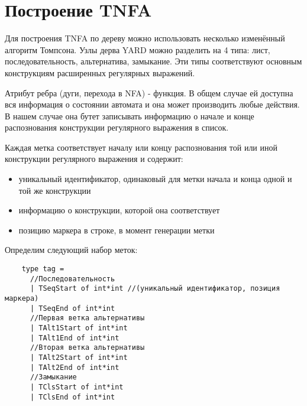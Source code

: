 \documentclass{article}
\begin{document}
\section{Построение TNFA}  

Для построения TNFA по дереву можно использовать несколько изменённый алгоритм Томпсона. Узлы дерва YARD можно разделить на 4 типа: лист, последовательность, альтернатива, замыкание. Эти типы соответствуют основным конструкциям расширенных регулярных выражений.

Атрибут ребра (дуги, перехода в NFA) - функция. В общем случае ей доступна вся информация о состоянии автомата и она может производить любые действия. В нашем случае она бутет записывать информацию о начале и конце распознования конструкции регулярного выражения в список. 

Каждая метка соответствует началу или концу распознования той или иной  конструкции регулярного выражения и содержит:
  \begin{itemize}
    \item уникальный идентификатор, одинаковый для метки начала и конца одной и той же конструкции
    \item информацию о конструкции, которой она соответствует
    \item позицию маркера в строке, в момент генерации метки
  \end{itemize}

Определим следующий набор меток:
  \begin{verbatim}
    type tag = 
      //Последовательность
      | TSeqStart of int*int //(уникальный идентификатор, позиция маркера)
      | TSeqEnd of int*int
      //Первая ветка альтернативы
      | TAlt1Start of int*int
      | TAlt1End of int*int  
      //Вторая ветка альтернативы
      | TAlt2Start of int*int
      | TAlt2End of int*int
      //Замыкание
      | TClsStart of int*int
      | TClsEnd of int*int  
  \end{verbatim}
\end{document}
